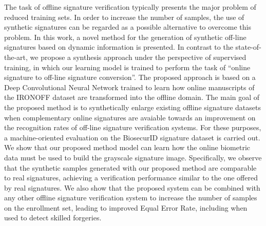 \setlength{\absparsep}{18pt} %
\begin{resumo}
The task of offline signature verification typically presents the major problem of reduced training sets. In order to increase the number of samples, the use of synthetic signatures can be regarded as a possible alternative to overcome this problem. In this work, a novel method for the generation of synthetic off-line signatures based on dynamic information is presented. In contrast to the state-of-the-art, we propose a synthesis approach under the perspective of supervised training, in which our learning model is trained to perform the task of ``online signature to off-line signature conversion''. The proposed approach is based on a Deep Convolutional Neural Network trained to learn how online manuscripts of the IRONOFF dataset are transformed into the offline domain. The main goal of the proposed method is to synthetically enlarge existing offline signature datasets when complementary online signatures are avaiable towards an improvement on the recognition rates of off-line signature verification systems. For these purposes, a machine-oriented evaluation on the BiosecurID signature dataset is carried out. We show that our proposed method model can learn how the online biometric data must be used to build the grayscale signature image. Specifically, we observe that the synthetic samples generated with our proposed method are comparable to real signatures, achieving a verification performance similar to the one offered by real signatures. We also show that the proposed system can be combined with any other offline signature verification system to increase the number of samples on the enrollment set, leading to improved Equal Error Rate, including when used to detect skilled forgeries.
\end{resumo}

